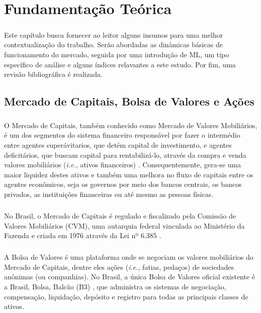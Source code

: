 \chapter{Fundamentação Teórica}
\label{cap2}


\paragraph{} Este capítulo busca fornecer ao leitor alguns insumos para uma melhor contextualização do trabalho. Serão abordadas as dinâmicas básicas de funcionamento do mercado, seguida por uma introdução de ML, um tipo específico de análise e alguns índices relavantes a este estudo. Por fim, uma revisão bibliográfica é realizada.



\FloatBarrier
\section{Mercado de Capitais, Bolsa de Valores e Ações}

\paragraph{} O Mercado de Capitais, também conhecido como Mercado de Valores Mobiliários, é um dos segmentos do sistema financeiro responsável por fazer o intermédio entre agentes superávitarios, que detém capital de investimento, e agentes deficitários, que buscam capital para rentabilizá-lo, através da compra e venda valores mobiliários (\textit{i.e.}, ativos financeiros) \cite{mercado_de_capitais}. Consequentemente, gera-se uma maior liquidez destes ativos e também uma melhora no fluxo de capitais entre os agentes econômicos, seja os governos por meio dos bancos centrais, os bancos privados, as instituições financeiras ou até mesmo as pessoas físicas.

\paragraph{} No Brasil, o Mercado de Capitais é regulado e fiscalizado pela Comissão de Valores Mobiliários (CVM), uma autarquia federal vinculada ao Ministério da Fazenda e criada em 1976 através da Lei nº 6.385 \cite{lei_6385}.

\paragraph{} A Bolsa de Valores é uma plataforma onde se negociam os valores mobiliários do Mercado de Capitais, dentre eles ações (\textit{i.e.}, fatias, pedaços) de sociedades anônimas (ou companhias). No Brasil, a única Bolsa de Valores oficial existente é a Brasil, Bolsa, Balcão (B3) \cite{b3}, que administra os sistemas de negociação, compensação, liquidação, depósito e registro para todas as principais classes de ativos.

